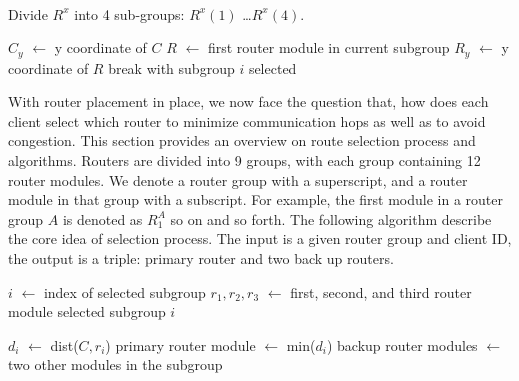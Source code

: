 \begin{algorithmic}[1]
\label{algo:fgr}
 \\ \hrulefill

\State Divide $R^x$ into 4 sub-groups: $R^x(1)$ \ldots $R^x(4)$.

    \State $C_y$ $\leftarrow$ y coordinate of $C$
    \State $R$ $\leftarrow$ first router module in current subgroup
    \State $R_y$ $\leftarrow$ y coordinate of $R$
    \State break with subgroup $i$ selected
    \EndIf
\EndFor


With router placement in place, we now face the question that, how does each
client select which router to minimize communication hops as well as to avoid
congestion. This section provides an overview on route selection process and
algorithms. Routers are divided into 9 groups, with each group containing 12
router modules. We denote a router group with a superscript, and a router
module in that group with a subscript. For example, the first module in a
router group $A$ is denoted as $R^A_1$ so on and so forth. The following
algorithm describe the core idea of selection process. The input is a given
router group and client ID, the output is a triple: primary router and two back
up routers.



\State $i$ $\leftarrow$ index of selected subgroup
\State $r_1, r_2, r_3$ $\leftarrow$ first, second, and third router module 
\State \hspace{\algorithmicindent} selected subgroup $i$

    \State $d_i$ $\leftarrow$ dist($C, r_i$) 
    \State primary router module $\leftarrow$ min($d_i$)
    \State backup router modules $\leftarrow$ 
     two other modules in the subgroup 
\EndFor

\EndProcedure
\\\hrulefill
\end{algorithmic}





